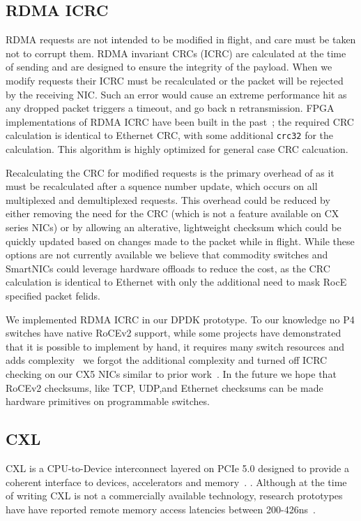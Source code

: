 \subsection{RDMA ICRC}
\label{sec:appendix_icrc}

RDMA requests are not intended to be modified in flight, and care must
be taken not to corrupt them. RDMA invariant CRCs (ICRC) are
calculated at the time of sending and are designed to ensure the
integrity of the payload. When we modify requests their ICRC must be
recalculated or the packet will be rejected by the receiving NIC. Such
an error would cause an extreme performance hit as any dropped packet
triggers a timeout, and go back n retransmission.  FPGA
implementations of RDMA ICRC have been built in the
past~\cite{Mansour_2019}; the required CRC calculation is identical to
Ethernet CRC, with some additional \texttt{crc32} for the
calculation. This algorithm is highly optimized for general case CRC
calcuation.

Recalculating the CRC for modified requests is the primary overhead of {\sword}
as it must be recalculated after a squence number update, which occurs on all
multiplexed and demultiplexed requests. This overhead could be reduced by either
removing the need for the CRC (which is not a feature available on CX series
NICs) or by allowing an alterative, lightweight checksum which could be quickly
updated based on changes made to the packet while in flight. While these options
are not currently available we believe that commodity switches and SmartNICs
could leverage hardware offloads to reduce the cost, as the CRC calculation is
identical to Ethernet with only the additional need to mask RocE specified
packet felids.

We implemented RDMA ICRC in our DPDK prototype. To our knowledge no P4 switches
have native RoCEv2 support, while some projects have demonstrated that it is
possible to implement by hand, it requires many switch resources and adds
complexity~\cite{p4-telem} we forgot the additional complexity and turned off
ICRC checking on our CX5 NICs similar to prior work~\cite{switchml}. In the
future we hope that RoCEv2 checksums, like TCP, UDP,and Ethernet checksums can
be made hardware primitives on programmable switches.

\subsection{CXL} 
\label{sec:cxl}

CXL is a CPU-to-Device interconnect layered on PCIe 5.0 designed to provide a
coherent interface to devices, accelerators and memory~\cite{cxl-spec}.  .
Although at the time of writing CXL is not a commercially available technology,
research prototypes have have reported remote memory access latencies between
200-426ns~\cite{direct-cxl,microsoft-cxl-first-gen,facebook-cxl-tpp}.

